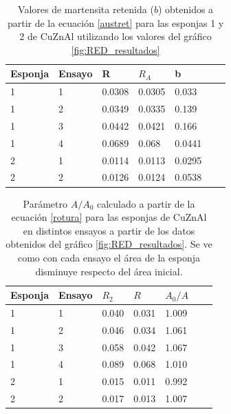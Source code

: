 \documentclass[a4paper,12pt,fleqn,twoside,openany]{book}
\begin{document}
 
\begin{table} 
\begin{center} 
\begin{tabular}{@{}lllllll@{}} \toprule
Esponja &Ensayo   &    R    &  ${R_A}$ &  b \\ \midrule
1 & 1       &  0.0308  & 0.0305   & 0.033  \\
1 & 2       &  0.0349  & 0.0335  &  0.139  \\
1 & 3       &  0.0442  & 0.0421  &  0.166  \\
1 & 4      &  0.0689 &	0.068 &	0.0441 \\
2 & 1      &  0.0114 &	0.0113 & 0.0295 \\
2 & 2      &  0.0126 &	0.0124 & 0.0538\\
 \bottomrule

 \end{tabular}
\caption{Valores de martensita retenida ($b$) obtenidos a partir de la ecuación \ref{austret} para las esponjas 1 y 2 de CuZnAl utilizando los valores del gráfico \ref{fig:RED_resultados} }
\label{tab:b}
\end{center}
\end{table}
\begin{table} 
\begin{center} 
\begin{tabular}{@{}lllllll@{}} \toprule
Esponja & Ensayo   &    $R_2$    &  ${R}$ &  $A_0/A$ \\ \midrule
1   & 1       &  0.040  & 0.031 & 1.009  \\
1   & 2       &  0.046  & 0.034 &  1.061  \\
1   & 3       &  0.058  & 0.042 &  1.067  \\
1   & 4     &  0.089  & 0.068 &  1.010 \\
2   & 1     &  0.015  & 0.011 &  0.992  \\
2   & 2    &  0.017  & 0.013 &  1.007   \\
\bottomrule
\end{tabular}
\caption{Parámetro $A/A_0$ calculado a partir de la ecuación \ref{rotura} para las esponjas de CuZnAl en distintos ensayos a partir de los datos obtenidos del gráfico \ref{fig:RED_resultados}. Se ve como con cada ensayo el área de la esponja disminuye respecto del área inicial.}
\label{tab:A0Arotura}
\end{center}
\end{table}
 
\end{document}
